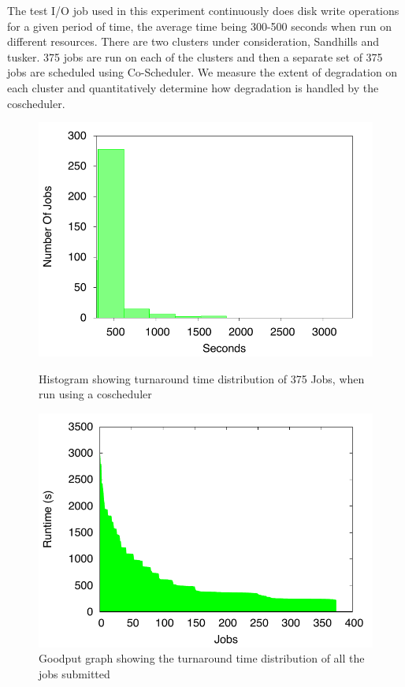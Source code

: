 \documentclass[ms,electronic,double]{nuthesis}
\begin{document}
The test I/O job used in this experiment continuously does disk write operations for a given period of time, the average
time being 300-500 seconds when run on different resources. There are two 
clusters under consideration, Sandhills and tusker. 375 jobs are run on each of 
the clusters and then a separate set of 375 jobs are scheduled using 
Co-Scheduler. We measure the extent of degradation on each cluster and quantitatively 
determine how degradation is handled by the coscheduler.


\begin{figure}[htbp!]
\begin{center}
\includegraphics{images/coscheduler_histogram}
\caption{Histogram showing turnaround time distribution of 375 Jobs, when run using a coscheduler}
\label{fig:coscheduler_histogram}
\end{center}

\begin{center}
\includegraphics{images/coscheduler_jobgoodput}
\caption{Goodput graph showing the turnaround time distribution of all the jobs submitted}
\label{fig:coscheduler_jobgoodput}
\end{center}


\end{figure}
\FloatBarrier
\end{document}
